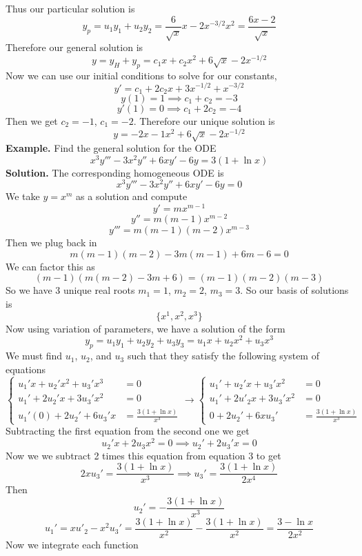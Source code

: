 \documentclass[openany]{report}
\begin{document}
Thus our particular solution is
\[y_p = u_1y_1 + u_2 y_2 = \frac{6}{\sqrt{x}}x - 2x^{-3/2}x^{2} = \frac{6x-2}{\sqrt{x}}\]
Therefore our general solution is
\[y = y_H + y_p = c_1x + c_2x^2 + 6\sqrt{x} - 2x^{-1/2}\]
Now we can use our initial conditions to solve for our constants,
\[y' = c_1 + 2c_2x + 3x^{-1/2} + x^{-3/2}\]
\[y(1) = 1 \implies c_1 + c_2 = -3\]
\[y'(1) = 0 \implies c_1 + 2c_2 = -4\]
Then we get $c_2 = -1$, $c_1 = -2$. Therefore our unique solution is
\[y = -2x - 1x^2 + 6\sqrt{x} - 2x^{-1/2}\]
\textbf{Example.} Find the general solution for the ODE 
\[x^3y''' -3x^2y'' + 6xy' - 6y = 3(1 + \ln x) \]
\textbf{Solution.} The corresponding homogeneous ODE is
\[x^3y''' - 3x^2y'' + 6xy' - 6y = 0\]
We take $y = x^m$ as a solution and compute 
\[y' = mx^{m-1}\]
\[y'' = m(m-1)x^{m-2}\]
\[y''' = m(m-1)(m-2)x^{m-3}\]
Then we plug back in 
\[m(m-1)(m-2) - 3m(m-1) + 6m - 6 = 0\]
We can factor this as 
\[(m-1)(m(m-2) - 3m + 6) = (m-1)(m-2)(m-3)\]
So we have 3 unique real roots $m_1 = 1$, $m_2 = 2$, $m_3 = 3$. So our basis of solutions is
\[\{x^1, x^2,x^3\}\]
Now using variation of parameters, we have a solution of the form
\[y_p = u_1y_1 + u_2y_2 + u_3y_3 = u_1x + u_2x^2 + u_3x^3\]
We must find $u_1$, $u_2$, and $u_3$ such that they satisfy the following system of equations
\[\begin{cases}
    u_1'x + u_2'x^2 + u_3'x^3 &= 0\\
    u_1' + 2u_2'x + 3u_3'x^2 &= 0\\
    u_1'(0) + 2u_2' + 6u_3'x &= \frac{3(1 + \ln x)}{x^3}
\end{cases} \rightarrow \begin{cases}
    u_1' + u_2'x + u_3'x^2 &= 0\\
    u_1' + 2u'_2x + 3u_3'x^2 &= 0\\
    0 + 2u_2' + 6xu_3' &= \frac{3(1+\ln x)}{x^3}
\end{cases}\]
Subtracting the first equation from the second one we get 
\[u_2'x + 2u_3x^2 = 0 \implies u_2' + 2u_3'x = 0\]
Now we we subtract 2 times this equation from equation 3 to get
\[2xu_3' = \frac{3(1+\ln x)}{x^3} \implies u_3' = \frac{3(1+\ln x)}{2x^4}\]
Then 
\[u_2' = -\frac{3(1+\ln x)}{x^3}\]
\[u_1' = xu'_2 - x^2u_3' = \frac{3(1+\ln x)}{x^2} - \frac{3(1+\ln x)}{x^2} = \frac{3-\ln x}{2x^2}\]
Now we integrate each function 
\end{document}
